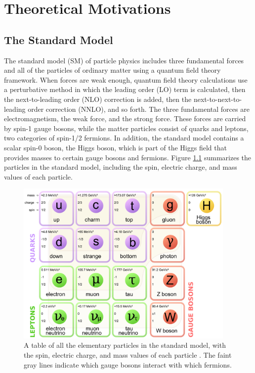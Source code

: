 \chapter{Theoretical Motivations
\label{ch:theory}}

\setcounter{section}{-1}

\section{The Standard Model}

The standard model (SM) of particle physics includes three fundamental forces and all of the particles of ordinary matter using a quantum field theory framework. When forces are weak enough, quantum field theory calculations use a perturbative method in which the leading order (LO) term is calculated, then the next-to-leading order (NLO) correction is added, then the next-to-next-to-leading order correction (NNLO), and so forth. The three fundamental forces are electromagnetism, the weak force, and the strong force. These forces are carried by spin-1 gauge bosons, while the matter particles consist of quarks and leptons, two categories of spin-1/2 fermions. In addition, the standard model contains a scalar spin-0 boson, the Higgs boson, which is part of the Higgs field that provides masses to certain gauge bosons and fermions. Figure \ref{fig:sm-particles} summarizes the particles in the standard model, including the spin, electric charge, and mass values of each particle.

\begin{figure}[hbt]
\begin{center}
\includegraphics[width=0.95\textwidth]{figures/Standard_Model_of_Elementary_Particles.pdf}
\caption{A table of all the elementary particles in the standard model, with the spin, electric charge, and mass values of each particle \cite{MissMJ}. The faint gray lines indicate which gauge bosons interact with which fermions.}
\label{fig:sm-particles}
\end{center}
\end{figure}

